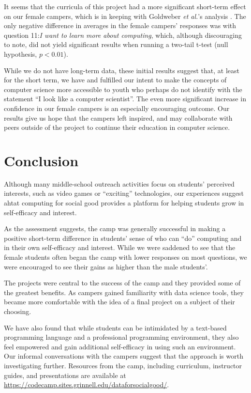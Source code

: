 It seems that the curricula of this project had a more significant
short-term effect on our female campers, which is in keeping with Goldweber
\textit{et al.}'s analysis \cite{Goldweber2013}.  The only negative
difference in averages in the female campers' responses was with
question 11:\textit{I want to learn more about computing}, which,
although discouraging to note, did not yield significant results
when running a two-tail t-test (null hypothesis, $p < 0.01$).

While we do not have long-term data, these initial results suggest
that, at least for the short term, we have and fulfilled our intent
to make the concepts of computer science more accessible to youth
who perhaps do not identify with the statement ``I look like a
computer scientist''. The even more significant increase in confidence
in our female campers is an especially encouraging outcome. Our
results give us hope that the campers left inspired, and may
collaborate with peers outside of the project to continue their
education in computer science.

\section{Conclusion}

Although many middle-school outreach activities focus on students'
perceived interests, such as video games or ``exciting'' technologies,
our experiences suggest ahtat computing for social good
provides a platform for helping students grow in self-efficacy and
interest.

As the assessment suggests, the camp was generally successful in
making a positive short-term difference in students' sense of who
can ``do'' computing and in their own self-efficacy and interest.
While we were saddened to see that the female students often began
the camp with lower responses on most questions, we were encouraged
to see their gains as higher than the male students'.

The projects were central to the success of the camp and they
provided some of the greatest benefits.  As campers gained
familiarity with data science tools, they became more comfortable
with the idea of a final project on a subject of their choosing.

We have also found that while students can be intimidated by a
text-based programming language and a professional programming
environment, they also feel empowered and gain additional self-efficacy
in using such an environment.  Our informal conversations with the
campers suggest that the approach is worth investigating further.
Resources from the camp, including curriculum, instructor guides,
and presentations are available at \url{https://codecamp.sites.grinnell.edu/dataforsocialgood/}.
